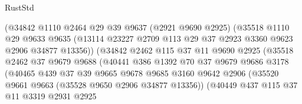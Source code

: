 \begin{lexlean}{RustStd}
\begin{coremodule}
                            (@34842
                              @1110
                              @2464
                              @29
                              @39
                              @9637
                              (@2921 @9690 @2925)
                              (@35518
                                @1110
                                @29
                                @9633
                                @9635
                                (@13114
                                  @23227
                                  @2709
                                  @113
                                  @29
                                  @37
                                  @2923
                                  @3360
                                  @9623
                                  @2906
                                  @34877
                                  @13356))
                              (@34842
                                @2462
                                @115
                                @37
                                @11
                                @9690
                                @2925
                                (@35518
                                  @2462
                                  @37
                                  @9679
                                  @9688
                                  (@40441
                                    @386
                                    @1392
                                    @70
                                    @37
                                    @9679
                                    @9686
                                    @3178
                                    (@40465
                                      @439
                                      @37
                                      @39
                                      @9665
                                      @9678
                                      @9685
                                      @3160
                                      @9642
                                      @2906
                                      (@35520 @9661 @9663 (@35528 @9650 @2906 @34877 @13356))
                                      (@40449
                                        @437
                                        @115
                                        @37
                                        @11
                                        @3319
                                        @2931
                                        @2925

\end{coremodule}
\end{lexlean}
